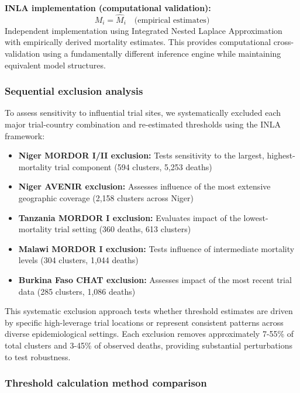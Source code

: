 \documentclass[11pt]{article}\usepackage[]{graphicx}\usepackage[]{xcolor}
\begin{document}
\textbf{INLA implementation (computational validation):}
\begin{equation}
M_i = \hat{M}_i \quad \text{(empirical estimates)}
\end{equation}
Independent implementation using Integrated Nested Laplace Approximation \citep{lindgren2015bayesian} with empirically derived mortality estimates. This provides computational cross-validation using a fundamentally different inference engine while maintaining equivalent model structures.

\subsubsection{Sequential exclusion analysis}

To assess sensitivity to influential trial sites, we systematically excluded each major trial-country combination and re-estimated thresholds using the INLA framework:

\begin{itemize}
\item \textbf{Niger MORDOR I/II exclusion:} Tests sensitivity to the largest, highest-mortality trial component (594 clusters, 5,253 deaths)
\item \textbf{Niger AVENIR exclusion:} Assesses influence of the most extensive geographic coverage (2,158 clusters across Niger)
\item \textbf{Tanzania MORDOR I exclusion:} Evaluates impact of the lowest-mortality trial setting (360 deaths, 613 clusters)
\item \textbf{Malawi MORDOR I exclusion:} Tests influence of intermediate mortality levels (304 clusters, 1,044 deaths)
\item \textbf{Burkina Faso CHAT exclusion:} Assesses impact of the most recent trial data (285 clusters, 1,086 deaths)
\end{itemize}

This systematic exclusion approach tests whether threshold estimates are driven by specific high-leverage trial locations or represent consistent patterns across diverse epidemiological settings. Each exclusion removes approximately 7-55\% of total clusters and 3-45\% of observed deaths, providing substantial perturbations to test robustness.

\subsubsection{Threshold calculation method comparison}
\end{document}
